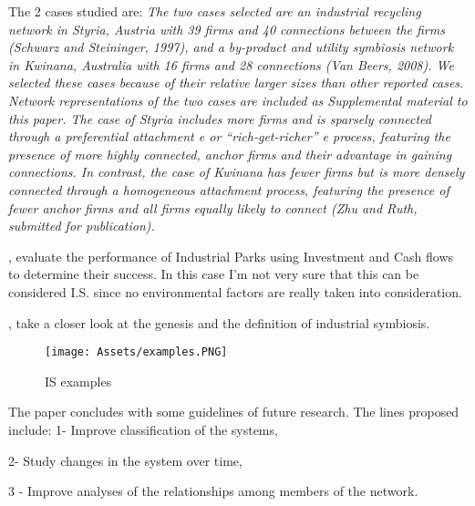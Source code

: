 The 2 cases studied are: \textit{The two cases selected are an industrial recycling network in Styria, Austria with 39 firms and 40 connections between the firms (Schwarz and Steininger, 1997), and a by-product and utility symbiosis network in Kwinana, Australia with 16 firms and 28 connections (Van Beers, 2008). We selected these cases because of their relative larger sizes than other reported cases. Network representations of the two cases are included as Supplemental material to this paper. The case of Styria includes more firms and is sparsely connected through a preferential attachment e or “rich-get-richer” e process, featuring the presence of more highly connected, anchor firms and their advantage in gaining connections. In contrast, the case of Kwinana has fewer firms but is more densely connected through a homogeneous attachment process, featuring the presence of fewer anchor firms and all firms equally likely to connect (Zhu and Ruth, submitted for publication). }



\textbf{}\par
\textcite{Jung2013}, evaluate the performance of Industrial Parks using Investment and Cash flows to determine their success. In this case I'm not very sure that this can be considered I.S. since no environmental factors are really taken into consideration. 



\textbf{}\par
\textcite{Zhang2015a}, take a closer look at the genesis and the definition of industrial symbiosis. \par


\begin{figure}[h!]
    \centering
    \texttt{[image: Assets/examples.PNG]}
    \caption{IS examples}
    \label{fig:IS examples}
\end{figure}


The paper concludes with some guidelines of future research. The lines proposed include:
1- Improve classification of the systems, \par 
2- Study changes in the system over time,  \par 
3 - Improve analyses of the relationships among members of the network.



